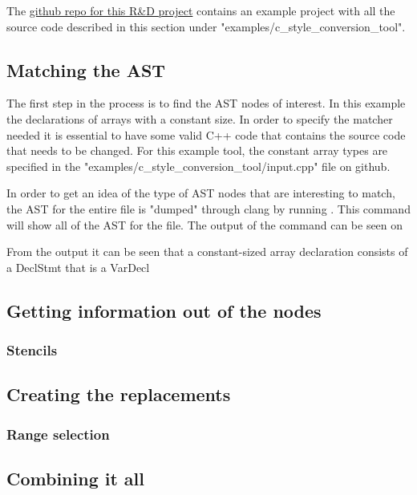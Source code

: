 The \href{https://github.com/mortenhaahr/RD}{github repo for this R\&D project} contains an example project with all the source code described in this section under "examples/c\_style\_conversion\_tool".

\subsection{Matching the AST}

The first step in the process is to find the AST nodes of interest. In this example the declarations of arrays with a constant size. In order to specify the matcher needed it is essential to have some valid C++ code that contains the source code that needs to be changed. For this example tool, the constant array types are specified in the "examples/c\_style\_conversion\_tool/input.cpp" file on github.

In order to get an idea of the type of AST nodes that are interesting to match, the AST for the entire file is "dumped" through clang by running . This command will show all of the AST for the file. The output of the command can be seen on 


From the output it can be seen that a constant-sized array declaration consists of a DeclStmt that is a VarDecl


\subsection{Getting information out of the nodes}

\subsubsection{Stencils}

\subsection{Creating the replacements}

\subsubsection{Range selection}

\subsection{Combining it all}